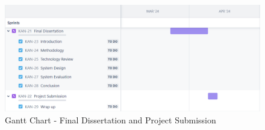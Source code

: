 \documentclass{report}
\begin{document}
\begin{figure}[h]
\includegraphics[scale=0.50]{images/gantt/final.png}
\caption{Gantt Chart - Final Dissertation and Project Submission}
\label{fig:final}
\centering
\end{figure}


\printbibliography
\end{document}
